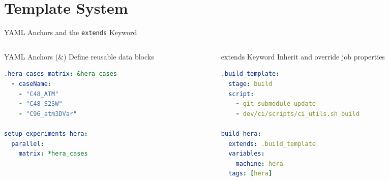 \documentclass[aspectratio=169]{beamer}
\begin{document}
\section{Template System}

\begin{frame}[fragile]{YAML Anchors and the \texttt{extends} Keyword}

\begin{columns}[T]
\begin{column}{0.48\textwidth}

\begin{block}{\textcolor{noaablue}{YAML Anchors (\&)}}
Define reusable data blocks
\end{block}

\begin{lstlisting}[language=yaml,basicstyle=\ttfamily\tiny]
.hera_cases_matrix: &hera_cases
  - caseName:
    - "C48_ATM"
    - "C48_S2SW"
    - "C96_atm3DVar"

setup_experiments-hera:
  parallel:
    matrix: *hera_cases
\end{lstlisting}

\vspace{0.2cm}
\end{column}

\begin{column}{0.48\textwidth}

\begin{block}{\textcolor{codegreen}{extends Keyword}}
Inherit and override job properties
\end{block}

\begin{lstlisting}[language=yaml,basicstyle=\ttfamily\tiny]
.build_template:
  stage: build
  script:
    - git submodule update
    - dev/ci/scripts/ci_utils.sh build

build-hera:
  extends: .build_template
  variables:
    machine: hera
  tags: [hera]
\end{lstlisting}

\end{column}
\end{columns}

\vspace{0.3cm}
\begin{center}
\end{center}

\end{frame}
\end{document}
